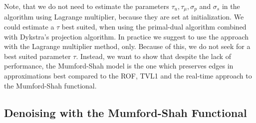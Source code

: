 \documentclass[abstracton]{scrreprt}
\begin{document}
            Note, that we do not need to estimate the parameters $\tau_{u}, \tau_{\mu}, \sigma_{p}$ and $\sigma_{s}$ in the algorithm using Lagrange multiplier, because they are set at initialization. We could estimate a $\tau$ best suited, when using the primal-dual algorithm combined with Dykstra's projection algorithm. In practice we suggest to use the approach with the Lagrange multiplier method, only. Because of this, we do not seek for a best suited parameter $\tau$. Instead, we want to show that despite the lack of performance, the Mumford-Shah model is the one which preserves edges in approximations best compared to the ROF, TVL1 and the real-time approach to the Mumford-Shah functional.


        \subsection{Denoising with the Mumford-Shah Functional} %
        \label{sub:denoising_with_the_mumford_shah_functional}
\end{document}
